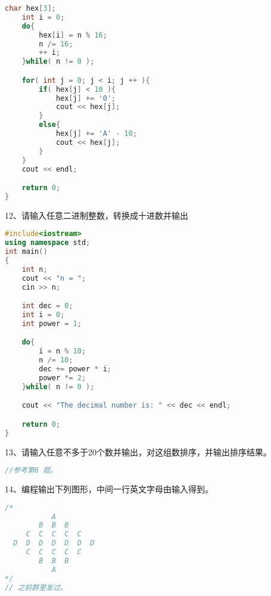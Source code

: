 \documentclass[14pt,aps,prb]{revtex4}
\begin{document}
\begin{spacing}{1.5}
\begin{lstlisting}[language=C++]
    char hex[3];
    int i = 0;
    do{
        hex[i] = n % 16;
        n /= 16;
        ++ i;
    }while( n != 0 );

    for( int j = 0; j < i; j ++ ){
        if( hex[j] < 10 ){
            hex[j] += '0';
            cout << hex[j];
        }
        else{
            hex[j] += 'A' - 10;
            cout << hex[j];
        }
    }
    cout << endl;

    return 0;
}
\end{lstlisting}

12、请输入任意二进制整数，转换成十进数并输出
\begin{lstlisting}[language=C++]
#include<iostream>
using namespace std;
int main()
{
    int n;
    cout << "n = ";
    cin >> n;

    int dec = 0;
    int i = 0;
    int power = 1;

    do{
        i = n % 10;
        n /= 10;
        dec += power * i;
        power *= 2;
    }while( n != 0 );

    cout << "The decimal number is: " << dec << endl;

    return 0;
}
\end{lstlisting}

13、请输入任意不多于20个数并输出，对这组数排序，并输出排序结果。
\begin{lstlisting}[language=C++]
//参考第6 题。
\end{lstlisting}

14、编程输出下列图形，中间一行英文字母由输入得到。
\begin{lstlisting}[language=C++]
/*
           A
        B  B  B
     C  C  C  C  C
  D  D  D  D  D  D  D
     C  C  C  C  C
        B  B  B
           A
*/
// 之前群里发过。
\end{lstlisting}

\end{spacing}
\end{document}
